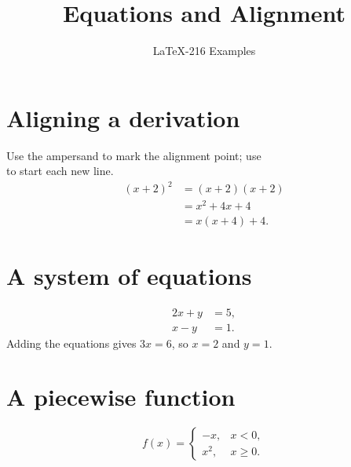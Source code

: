 \documentclass{article}
\title{Equations and Alignment}
\author{LaTeX-216 Examples}
\date{}
\begin{document}
\maketitle

\section{Aligning a derivation}
Use the ampersand to mark the alignment point; use \\ to start each new line.
\begin{align*}
  (x+2)^2 &= (x+2)(x+2) \\
          &= x^2+4x+4 \\
          &= x(x+4)+4.
\end{align*}

\section{A system of equations}
\begin{align}
  2x+y &= 5, \\
  x- y &= 1.
\end{align}
Adding the equations gives $3x=6$, so $x=2$ and $y=1$.

\section{A piecewise function}
\[
  f(x)=
  \begin{cases}
    -x, & x<0, \\
    x^2, & x\ge 0.
  \end{cases}
\]
\end{document}
